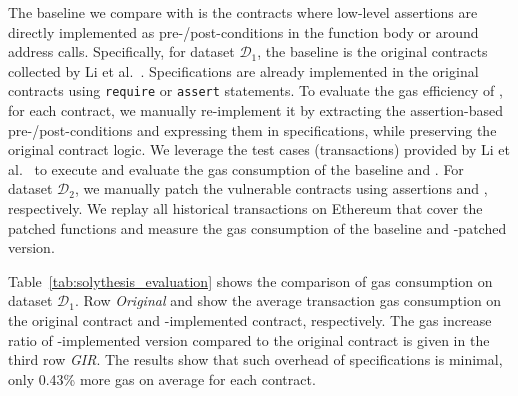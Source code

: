 The baseline we compare with \lang is the contracts where low-level assertions are directly implemented as pre-/post-conditions in the function body or around address calls.
Specifically, for dataset $\mathcal{D}_1$, the baseline is the original contracts collected by Li et al.~\cite{DBLP:conf/pldi/LiCL20}.
Specifications are already implemented in the original contracts using \texttt{require} or \texttt{assert} statements.
To evaluate the gas efficiency of \lang, for each contract, we manually re-implement it by extracting the assertion-based pre-/post-conditions and expressing them in \lang specifications, while preserving the original contract logic.
We leverage the test cases (transactions) provided by Li et al.~\cite{DBLP:conf/pldi/LiCL20} to execute and evaluate the gas consumption of the baseline and \lang.
For dataset $\mathcal{D}_2$, we manually patch the vulnerable contracts using assertions and \lang, respectively.
We replay all historical transactions on Ethereum that cover the patched functions and measure the gas consumption of the baseline and \lang-patched version.

Table~\ref{tab:solythesis_evaluation} shows the comparison of gas consumption on dataset $\mathcal{D}_1$.
Row \textit{Original} and \textit{\lang} show the average transaction gas consumption on the original contract and \lang-implemented contract, respectively.
The gas increase ratio of \lang-implemented version compared to the original contract is given in the third row \textit{GIR}.
The results show that such overhead of \lang specifications is minimal, only 0.43\% more gas on average for each contract. 

